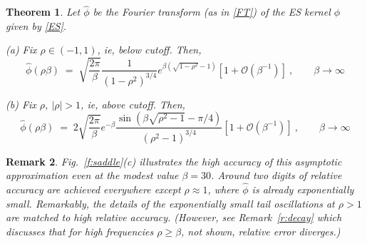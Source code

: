 \documentclass[10pt]{article}
\newcommand{\be}{\begin{equation}}
\newcommand{\ee}{\end{equation}}
\newcommand{\bigO}{{\mathcal O}}
\newtheorem{thm}{Theorem}
\newtheorem{rmk}[thm]{Remark}
\newcommand{\freq}{\beta}          %
\begin{document}
\begin{thm} %
  Let $\hat\phi$ be the Fourier transform (as in \eqref{FT}) of the ES kernel
  $\phi$ given by \eqref{ES}.
  
  (a)
  Fix $\rho\in(-1,1)$, ie, below cutoff. Then, %
\be
\hat\phi(\rho\freq) \; =\;
\sqrt{\frac{2\pi}{\beta}} \frac{1}{(1-\rho^2)^{3/4}} e^{\freq(\sqrt{1-\rho^2}-1)}
\left[ 1 + \bigO(\freq^{-1}) \right]
~, \qquad \freq\to\infty
\label{EShat1}
\ee

(b)
  Fix $\rho$, $|\rho| > 1$, ie, above cutoff. Then,
\be
\hat\phi(\rho\freq) \; =\;
2\sqrt{\frac{2\pi}{\beta}}
e^{-\freq}
\frac{\sin\left(\freq\sqrt{\rho^2-1} - \pi/4\right)}
{(\rho^2-1)^{3/4}}
\left[ 1 + \bigO(\freq^{-1}) \right]
~, \qquad \freq\to\infty
\label{EShat2}
\ee
\label{t:EShat}
\end{thm} %

\begin{rmk}
  Fig.~\ref{f:saddle}(c) illustrates the high accuracy of this
  asymptotic approximation even at the modest value $\freq=30$.
  Around two digits of {\em relative}
  accuracy are achieved everywhere except $\rho\approx 1$, where $\hat\phi$
  is already exponentially small.
  Remarkably, the details of the exponentially small tail oscillations
  at $\rho>1$ are matched to high relative accuracy.
  (However, see Remark~\ref{r:decay} which discusses that for high frequencies
  $\rho \ge \freq$, not shown, relative error diverges.)
  \label{r:match}
\end{rmk}
\end{document}
